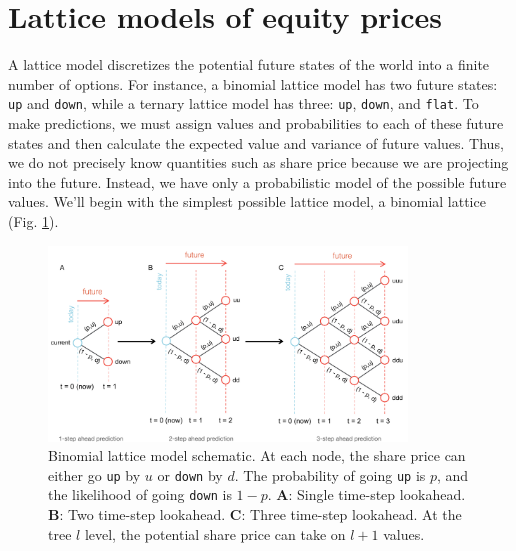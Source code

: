 \documentclass[11pt]{article}
\theoremstyle{definition}
\begin{document}
\section{Lattice models of equity prices}
A lattice model discretizes the potential future states of the world into a finite number of options. 
For instance, a binomial lattice model has two future states: \texttt{up} and \texttt{down}, while a ternary lattice model has three: \texttt{up}, \texttt{down}, and \texttt{flat}. 
To make predictions, we must assign values and probabilities to each of these future states and then calculate the expected value and variance of future values. 
Thus, we do not precisely know quantities such as share price because we are projecting into the future. Instead, we have only a probabilistic model of the possible future values. 
We'll begin with the simplest possible lattice model, a binomial lattice (Fig. \ref{fig:binomial-lattice-schematic}).
\begin{figure}[h]
    \centering
    \includegraphics[width=0.85\textwidth]{./figs/Fig-Binomial-LatticeModels-Schematic.pdf}
    \caption{Binomial lattice model schematic. 
	At each node, the share price can either go \texttt{up} by $u$ or \texttt{down} by $d$. 
	The probability of going \texttt{up} is $p$, and the likelihood of going \texttt{down} is $1-p$. 
	\textbf{A}: Single time-step lookahead.
	\textbf{B}: Two time-step lookahead.
	\textbf{C}: Three time-step lookahead.
	At the tree $l$ level, the potential share price can take on $l+1$ values.
	}\label{fig:binomial-lattice-schematic}
\end{figure}
\end{document}
